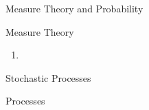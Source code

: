 \documentclass{article}
\begin{document}
\begin{section}{Measure Theory and Probability}
\begin{subsection}{Measure Theory}
\begin{enumerate}
\item 
\end{enumerate}
\end{subsection}
\end{section}

\begin{section}{Stochastic Processes}
\begin{subsection}{Processes}

\end{subsection}
\end{section}
\end{document}
